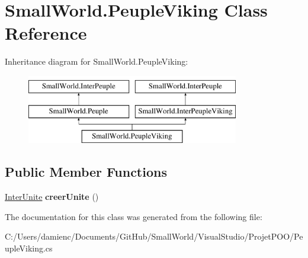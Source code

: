 \hypertarget{class_small_world_1_1_peuple_viking}{\section{Small\-World.\-Peuple\-Viking Class Reference}
\label{class_small_world_1_1_peuple_viking}
}
Inheritance diagram for Small\-World.\-Peuple\-Viking\-:\begin{figure}[H]
\begin{center}
\leavevmode
\includegraphics[height=3.000000cm]{class_small_world_1_1_peuple_viking}
\end{center}
\end{figure}
\subsection*{Public Member Functions}
\begin{DoxyCompactItemize}
\item 
\hypertarget{class_small_world_1_1_peuple_viking_aaf09d9edd84991f86f3177cb90b254bd}{\hyperlink{interface_small_world_1_1_inter_unite}{Inter\-Unite} {\bfseries creer\-Unite} ()}\label{class_small_world_1_1_peuple_viking_aaf09d9edd84991f86f3177cb90b254bd}

\end{DoxyCompactItemize}


The documentation for this class was generated from the following file\-:\begin{DoxyCompactItemize}
\item 
C\-:/\-Users/damienc/\-Documents/\-Git\-Hub/\-Small\-World/\-Visual\-Studio/\-Projet\-P\-O\-O/Peuple\-Viking.\-cs\end{DoxyCompactItemize}
